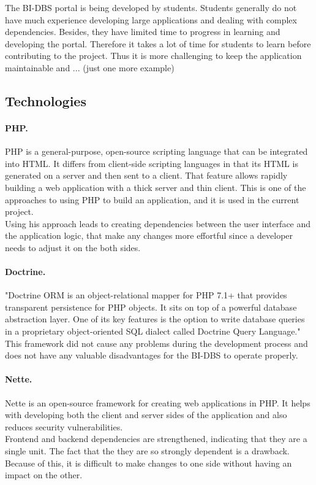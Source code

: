 \noindent The BI-DBS portal is being developed by students. Students generally do not have much experience developing large applications and dealing with complex dependencies. Besides, they have limited time to progress in learning and developing the portal. Therefore it takes a lot of time for students to learn before contributing to the project. Thus it is more challenging to keep the application maintainable and ... (just one more example)


\subsection{Technologies}
\paragraph*{PHP.} PHP is a general-purpose, open-source scripting language that can be integrated into HTML. It differs from client-side scripting languages in that its HTML is generated on a server and then sent to a client. That feature allows rapidly building a web application with a thick server and thin client. This is one of the approaches to using PHP to build an application, and it is used in the current project. \\
Using his approach leads to creating dependencies between the user interface and the application logic, that make any changes more effortful since a developer needs to adjust it on the both sides.

\paragraph*{Doctrine.} "Doctrine ORM is an object-relational mapper for PHP 7.1+ that provides transparent persistence for PHP objects. It sits on top of a powerful database abstraction layer. One of its key features is the option to write database queries in a proprietary object-oriented SQL dialect called Doctrine Query Language." \\ 
This framework did not cause any problems during the development process and does not have any valuable disadvantages for the BI-DBS to operate properly.


\paragraph*{Nette.} Nette is an open-source framework for creating web applications in PHP. It helps with developing both the client and server sides of the application and also reduces security vulnerabilities.\\ 
Frontend and backend dependencies are strengthened, indicating that they are a single unit. The fact that the they are so strongly dependent is a drawback. Because of this, it is difficult to make changes to one side without having an impact on the other.

